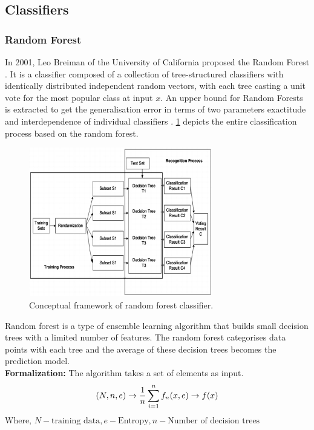 \documentclass[conference]{IEEEtran}
\begin{document}
	\subsection{Classifiers}
	\subsubsection[H]{Random Forest}
	In 2001, Leo Breiman of the University of California proposed the Random Forest \cite{C26}. It is a classifier composed of a collection of tree-structured classifiers with identically distributed independent random vectors, with each tree casting a unit vote for the most popular class at input $x$\cite{C27}. An upper bound for Random Forests is extracted to get the generalisation error in terms of two parameters exactitude and interdependence of individual classifiers \cite{C25}. \figurename{\ref{Random Forest}} depicts the entire classification process based on the random forest.\\	
	\begin{figure}[H]
		\centerline{\includegraphics[width=80mm,scale=1]{RandomForest.png}}
		\caption{Conceptual framework of random forest classifier\cite{C24}.}
		\label{Random Forest}
	\end{figure}	
	Random forest is a type of ensemble learning algorithm that builds small decision trees with a limited number of features. The random forest categorises data points with each tree and the average of these decision trees becomes the prediction model.\\	
	\textbf{Formalization:} The algorithm takes a set of elements as input.\\	
	\begin{equation*}
			(N,n,e) \to \frac{1}{n} \sum_{i=1}^{n}f_{n}(x,e) \to f(x) \\ 
	\end{equation*}
	$\text{Where, } N - \text{training data}, e - \text{Entropy}, n - \text{Number of decision trees}$
\end{document}
